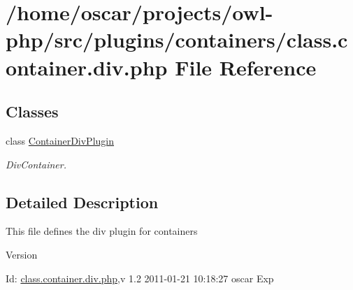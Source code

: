\section{/home/oscar/projects/owl-\/php/src/plugins/containers/class.container.div.php File Reference}
\label{class_8container_8div_8php}
\subsection*{Classes}
\begin{DoxyCompactItemize}
\item 
class \hyperlink{classContainerDivPlugin}{ContainerDivPlugin}
\begin{DoxyCompactList}\small\item\em DivContainer. \item\end{DoxyCompactList}\end{DoxyCompactItemize}


\subsection{Detailed Description}
This file defines the div plugin for containers \begin{DoxyVersion}{Version}

\end{DoxyVersion}
\begin{DoxyParagraph}{Id:}
\hyperlink{class_8container_8div_8php}{class.container.div.php},v 1.2 2011-\/01-\/21 10:18:27 oscar Exp 
\end{DoxyParagraph}

